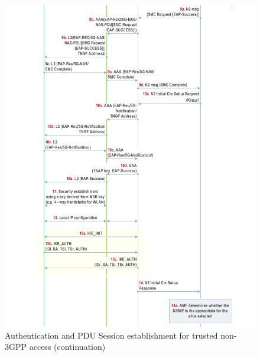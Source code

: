 \begin{figure}
    \centering
    \includegraphics[width=1\linewidth]{figs/Authentication and PDU Session establishment for trusted non-3GPP access_2.png}
    \caption{Authentication and \acs{PDU} Session establishment for trusted non-\acs{3GPP} access (continuation)}
    \label{fig:Authentication and PDU Session establishment for trusted non-3GPP access_2}
\end{figure}

